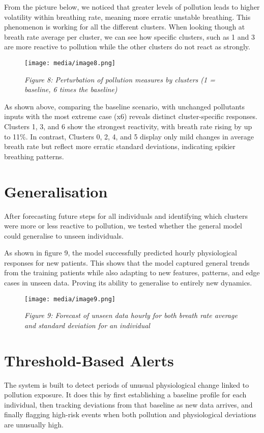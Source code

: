 \documentclass[12pt,a4paper]{report}
\begin{document}
From the picture below, we noticed that greater levels of pollution
leads to higher volatility within breathing rate, meaning more erratic
unstable breathing. This phenomenon is working for all the different
clusters. When looking though at breath rate average per cluster, we can
see how specific clusters, such as 1 and 3 are more reactive to
pollution while the other clusters do not react as strongly.

\begin{figure}[h!]
    \centering
    \texttt{[image: media/image8.png]}
    \caption*{\emph{Figure 8: Perturbation of pollution measures by clusters (1 = baseline, 6 times the baseline)}}
\end{figure}


As shown above, comparing the baseline scenario, with unchanged
pollutants inputs with the most extreme case (x6) reveals distinct
cluster-specific responses. Clusters 1, 3, and 6 show the strongest
reactivity, with breath rate rising by up to 11\%. In contrast, Clusters
0, 2, 4, and 5 display only mild changes in average breath rate but
reflect more erratic standard deviations, indicating spikier breathing
patterns.

\section{Generalisation}
After forecasting future steps for all individuals and identifying which
clusters were more or less reactive to pollution, we tested whether the
general model could generalise to unseen individuals.

As shown in figure 9, the model successfully predicted hourly
physiological responses for new patients. This shows that the model
captured general trends from the training patients while also adapting
to new features, patterns, and edge cases in unseen data. Proving its
ability to generalise to entirely new dynamics.


\begin{figure}[h!]
    \centering
    \texttt{[image: media/image9.png]}
    \caption*{\emph{Figure 9: Forecast of unseen data hourly for both breath rate
average and standard deviation for an individual}}

\end{figure}



\section{Threshold-Based Alerts}
The system is built to detect periods of unusual physiological change
linked to pollution exposure. It does this by first establishing a
baseline profile for each individual, then tracking deviations from that
baseline as new data arrives, and finally flagging high-risk events when
both pollution and physiological deviations are unusually high.
\end{document}
